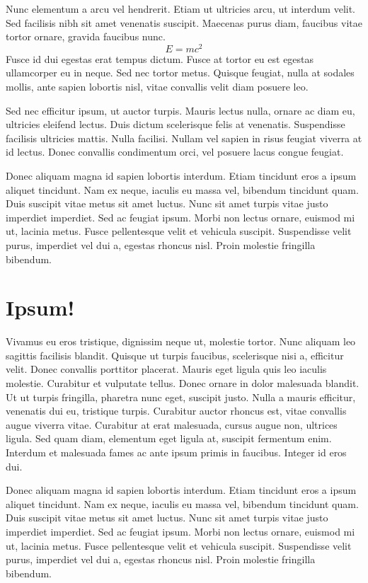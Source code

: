 \documentclass{ocsmnar}
\begin{document}
Nunc elementum a arcu vel hendrerit.
Etiam ut ultricies arcu, ut interdum velit.
Sed facilisis nibh sit amet venenatis suscipit.
Maecenas purus diam, faucibus vitae tortor ornare, gravida faucibus nunc.
\begin{displaymath}
  E = m c^2
\end{displaymath}
Fusce id dui egestas erat tempus dictum.
Fusce at tortor eu est egestas ullamcorper eu in neque.
Sed nec tortor metus.
Quisque feugiat, nulla at sodales mollis, ante sapien lobortis nisl, vitae convallis velit diam posuere leo.


Sed nec efficitur ipsum, ut auctor turpis.
Mauris lectus nulla, ornare ac diam eu, ultricies eleifend lectus.
Duis dictum scelerisque felis at venenatis.
Suspendisse facilisis ultricies mattis.
Nulla facilisi.
Nullam vel sapien in risus feugiat viverra at id lectus.
Donec convallis condimentum orci, vel posuere lacus congue feugiat.


Donec aliquam magna id sapien lobortis interdum.
Etiam tincidunt eros a ipsum aliquet tincidunt.
Nam ex neque, iaculis eu massa vel, bibendum tincidunt quam.
Duis suscipit vitae metus sit amet luctus.
Nunc sit amet turpis vitae justo imperdiet imperdiet.
Sed ac feugiat ipsum.
Morbi non lectus ornare, euismod mi ut, lacinia metus.
Fusce pellentesque velit et vehicula suscipit.
Suspendisse velit purus, imperdiet vel dui a, egestas rhoncus nisl.
Proin molestie fringilla bibendum.


\section{Ipsum!}


Vivamus eu eros tristique, dignissim neque ut, molestie tortor.
Nunc aliquam leo sagittis facilisis blandit.
Quisque ut turpis faucibus, scelerisque nisi a, efficitur velit.
Donec convallis porttitor placerat.
Mauris eget ligula quis leo iaculis molestie.
Curabitur et vulputate tellus.
Donec ornare in dolor malesuada blandit.
Ut ut turpis fringilla, pharetra nunc eget, suscipit justo.
Nulla a mauris efficitur, venenatis dui eu, tristique turpis.
Curabitur auctor rhoncus est, vitae convallis augue viverra vitae.
Curabitur at erat malesuada, cursus augue non, ultrices ligula.
Sed quam diam, elementum eget ligula at, suscipit fermentum enim.
Interdum et malesuada fames ac ante ipsum primis in faucibus.
Integer id eros dui.


Donec aliquam magna id sapien lobortis interdum.
Etiam tincidunt eros a ipsum aliquet tincidunt.
Nam ex neque, iaculis eu massa vel, bibendum tincidunt quam.
Duis suscipit vitae metus sit amet luctus.
Nunc sit amet turpis vitae justo imperdiet imperdiet.
Sed ac feugiat ipsum.
Morbi non lectus ornare, euismod mi ut, lacinia metus.
Fusce pellentesque velit et vehicula suscipit.
Suspendisse velit purus, imperdiet vel dui a, egestas rhoncus nisl.
Proin molestie fringilla bibendum.
\end{document}
